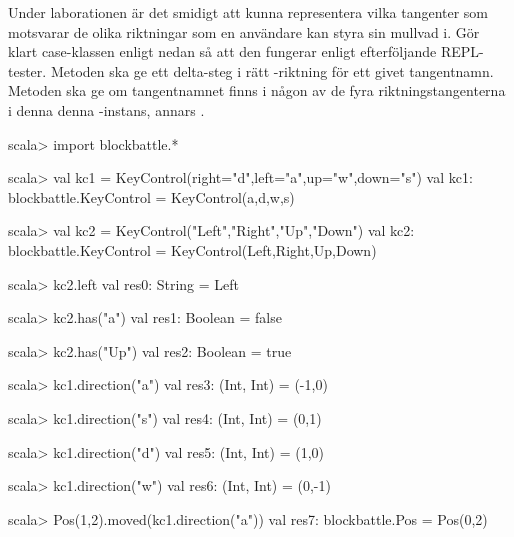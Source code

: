\Subtask Under laborationen är det smidigt att kunna representera vilka tangenter som motsvarar de olika riktningar som en användare kan styra sin mullvad i. Gör klart case-klassen  enligt nedan så att den fungerar enligt efterföljande REPL-tester. Metoden  ska ge ett delta-steg i rätt -riktning för ett givet tangentnamn. Metoden  ska ge  om tangentnamnet finns i någon av de fyra riktningstangenterna i denna denna -instans, annars .
%
\begin{REPL}
scala> import blockbattle.*

scala> val kc1 = KeyControl(right="d",left="a",up="w",down="s")
val kc1: blockbattle.KeyControl = KeyControl(a,d,w,s)

scala> val kc2 = KeyControl("Left","Right","Up","Down")
val kc2: blockbattle.KeyControl = KeyControl(Left,Right,Up,Down)

scala> kc2.left
val res0: String = Left

scala> kc2.has("a")
val res1: Boolean = false

scala> kc2.has("Up")
val res2: Boolean = true

scala> kc1.direction("a")
val res3: (Int, Int) = (-1,0)

scala> kc1.direction("s")
val res4: (Int, Int) = (0,1)

scala> kc1.direction("d")
val res5: (Int, Int) = (1,0)

scala> kc1.direction("w")
val res6: (Int, Int) = (0,-1)

scala> Pos(1,2).moved(kc1.direction("a"))
val res7: blockbattle.Pos = Pos(0,2)
\end{REPL}


